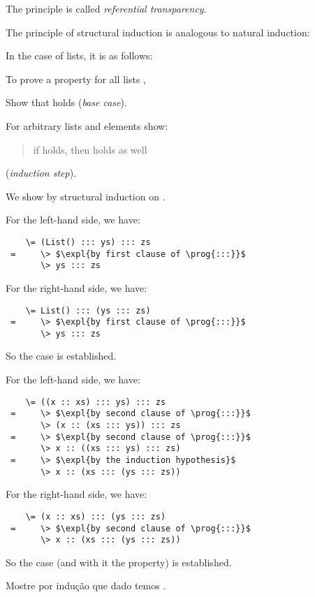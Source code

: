 {The principle is called {\em\emph{referential transparency}}.
\es
{}

The principle of structural induction is analogous to natural induction:

In the case of lists, it is as follows:

To prove a property  for all lists ,
\be
\item Show that  holds (\emph{base case}).
\item For arbitrary lists  and elements  
      show:
\begin{quote}
     if  holds, then  holds as well
\end{quote}
(\emph{induction step}).
\ee

\es
{}

We show  by structural induction
on .

For the left-hand side, we have:
\begin{lstlisting}
    \= (List() ::: ys) ::: zs
 =     \> $\expl{by first clause of \prog{:::}}$
       \> ys ::: zs
\end{lstlisting}
For the right-hand side, we have:
\begin{lstlisting}
    \= List() ::: (ys ::: zs)
 =     \> $\expl{by first clause of \prog{:::}}$
       \> ys ::: zs
\end{lstlisting}
So the case is established.

\es
\bs
{} 

For the left-hand side, we have:
\begin{lstlisting}
    \= ((x :: xs) ::: ys) ::: zs
 =     \> $\expl{by second clause of \prog{:::}}$
       \> (x :: (xs ::: ys)) ::: zs
 =     \> $\expl{by second clause of \prog{:::}}$
       \> x :: ((xs ::: ys) ::: zs)
 =     \> $\expl{by the induction hypothesis}$
       \> x :: (xs ::: (ys ::: zs))
\end{lstlisting}

For the right-hand side, we have:
\begin{lstlisting}
    \= (x :: xs) ::: (ys ::: zs)
 =     \> $\expl{by second clause of \prog{:::}}$
       \> x :: (xs ::: (ys ::: zs))
\end{lstlisting}
So the case (and with it the property) is established.

\begin{exercise}
Mostre por indu\c{c}\~{a}o que dado  temos . 
\es
{}
\end{exercise}

}
